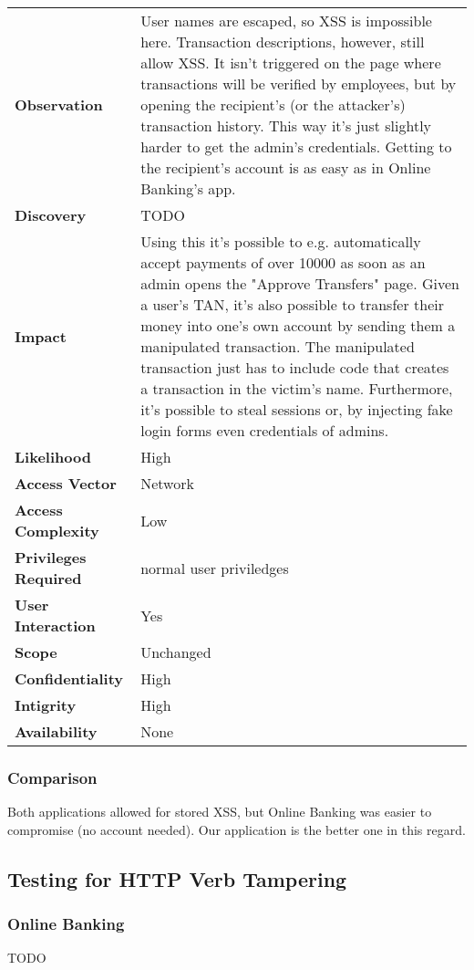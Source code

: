 \begin{tabular}{l|p{10cm}}
\textbf{Observation} & User names are escaped, so XSS is impossible here. Transaction descriptions, however, still allow XSS. It isn't triggered on the page where transactions will be verified by employees, but by opening the recipient's (or the attacker's) transaction history. This way it's just slightly harder to get the admin's credentials. Getting to the recipient's account is as easy as in Online Banking's app. \\
\textbf{Discovery} & TODO \\
\textbf{Impact} & Using this it's possible to e.g. automatically accept payments of over 10000 as soon as an admin opens the "Approve Transfers" page. Given a user's TAN, it's also possible to transfer their money into one's own account by sending them a manipulated transaction. The manipulated transaction just has to include code that creates a transaction in the victim's name. Furthermore, it's possible to steal sessions or, by injecting fake login forms even credentials of admins. \\
\textbf{Likelihood} & High \\
\textbf{Access Vector} & Network \\
\textbf{Access Complexity} & Low\\
\textbf{Privileges Required} & normal user priviledges \\
\textbf{User Interaction} & Yes\\
\textbf{Scope} & Unchanged \\
\textbf{Confidentiality} & High\\
\textbf{Intigrity} & High \\
\textbf{Availability} & None\\
\end{tabular}

\subsubsection*{Comparison}
Both applications allowed for stored XSS, but Online Banking was easier to compromise (no account needed).
Our application is the better one in this regard.

\subsection{Testing for HTTP Verb Tampering}

\subsubsection*{Online Banking}
TODO

